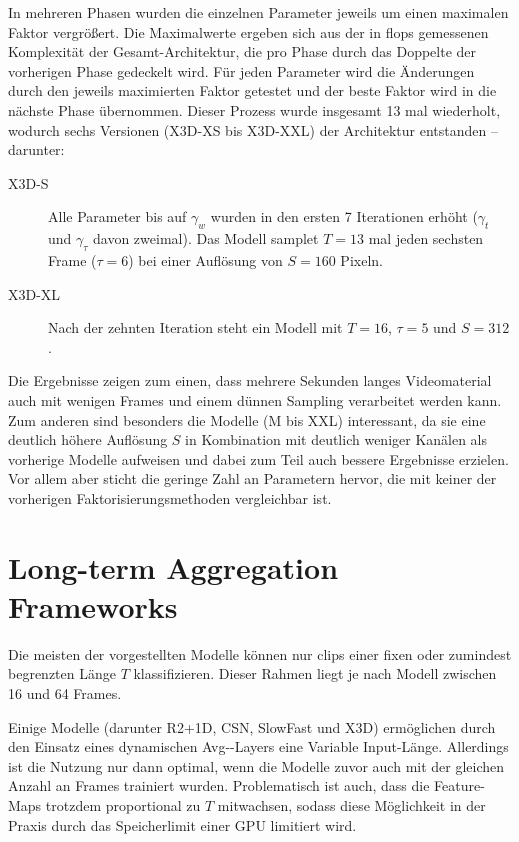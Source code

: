 In mehreren Phasen wurden die einzelnen Parameter jeweils um einen maximalen Faktor vergrößert.
Die Maximalwerte ergeben sich aus der in \gls{flops} gemessenen Komplexität der Gesamt-Architektur, die pro Phase durch das Doppelte der vorherigen Phase gedeckelt wird.
Für jeden Parameter wird die Änderungen durch den jeweils maximierten Faktor getestet und der beste Faktor wird in die nächste Phase übernommen.
Dieser Prozess wurde insgesamt 13 mal wiederholt, wodurch sechs Versionen (X3D-XS bis X3D-XXL) der Architektur entstanden -- darunter:

\begin{description}
    \item[X3D-S] Alle Parameter bis auf $\gamma_w$ wurden in den ersten 7 Iterationen erhöht ($\gamma_t$ und $\gamma_\tau$ davon zweimal).
    Das Modell samplet $T=13$ mal jeden sechsten Frame ($\tau = 6$) bei einer Auflösung von $S=160$ Pixeln.
    \item[X3D-XL] Nach der zehnten Iteration steht ein Modell mit $T=16$, $\tau = 5$ und $S=312$.
\end{description}

Die Ergebnisse zeigen zum einen, dass mehrere Sekunden langes Videomaterial auch mit wenigen Frames und einem dünnen Sampling verarbeitet werden kann.
Zum anderen sind besonders die Modelle (M bis XXL) interessant, da sie eine deutlich höhere Auflösung $S$ in Kombination mit deutlich weniger Kanälen als vorherige Modelle aufweisen und dabei zum Teil auch bessere Ergebnisse erzielen.
Vor allem aber sticht die geringe Zahl an Parametern hervor, die mit keiner der vorherigen Faktorisierungsmethoden vergleichbar ist.

\section{Long-term Aggregation Frameworks}
\label{sec:long-term-aggregation-frameworks}

Die meisten der vorgestellten Modelle können nur \glspl{clip} einer fixen oder zumindest begrenzten Länge $T$ klassifizieren.
Dieser Rahmen liegt je nach Modell zwischen 16 und 64 Frames.

Einige Modelle (darunter R2+1D, CSN, SlowFast und X3D) ermöglichen durch den Einsatz eines dynamischen Avg-\pool-Layers eine Variable Input-Länge.
Allerdings ist die Nutzung nur dann optimal, wenn die Modelle zuvor auch mit der gleichen Anzahl an Frames trainiert wurden.
Problematisch ist auch, dass die Feature-Maps trotzdem proportional zu $T$ mitwachsen, sodass diese Möglichkeit in der Praxis \zB durch das Speicherlimit einer GPU limitiert wird.

